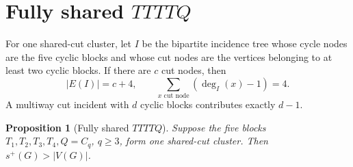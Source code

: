 \documentclass[11pt]{article}
\newtheorem{proposition}[theorem]{Proposition}
\newcommand{\spE}{s^+}
\begin{document}
\section{Fully shared $TTTTQ$}

For one shared-cut cluster, let $I$ be the bipartite incidence tree whose cycle
nodes are the five cyclic blocks and whose cut nodes are the vertices belonging
to at least two cyclic blocks.  If there are $c$ cut nodes, then
\begin{equation}\label{eq:incidence-excess}
 |E(I)|=c+4,
 \qquad \sum_{x\text{ cut node}}(\deg_I(x)-1)=4.
\end{equation}
A multiway cut incident with $d$ cyclic blocks contributes exactly $d-1$.

\begin{proposition}[Fully shared $TTTTQ$]\label{prop:shared-ttttq}
Suppose the five blocks $T_1,T_2,T_3,T_4,Q=C_q$, $q\geq3$, form one
shared-cut cluster.  Then $\spE(G)>|V(G)|$.
\end{proposition}
\end{document}
